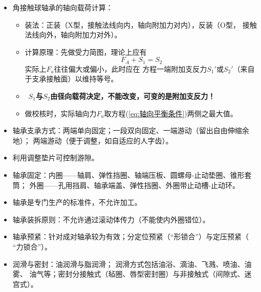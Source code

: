 \documentclass[12pt,a4paper]{article}
\newcommand{\tightlist}{\setlength{\parskip}{0pt}\setlength{\itemsep}{0pt}}
\newcommand{\hint}[1]{\textsf{（#1）}}
\newcommand{\minor}[1]{{\color{gray} #1}}
\renewcommand{\emph}[1]{\faIcon[regular]{lightbulb}\ \textbf{#1}}
\begin{document}
\begin{itemize}
{    算。}
    \item 角接触球轴承的轴向载荷计算：
    \begin{itemize}\tightlist
        \item 装法：正装\hint{X型，接触法线向内，轴向附加力对内}，反装\hint{O型，
        接触法线向外，轴向附加力对外}。
        \item 计算原理：先做受力简图，理论上应有
        \begin{equation}\label{eq:轴向平衡条件}
        F_A+S_1=S_2
        \end{equation}
        实际上$F_a$往往偏大或偏小，此时应在
        方程一端附加支反力$S_1'$或$S_2'$\hint{来自于支承接触面}以维持等号。
        \item \emph{$S_1$与$S_2$由径向载荷决定，不能改变，可变的是附加支反力！}
        \item 做校核时，实际轴向力$F_a$取方程(\ref{eq:轴向平衡条件})两侧之最大值。
    \end{itemize}
    \item 轴承支承方式：两端单向固定；一段双向固定、一端游动\hint{留出自由伸缩余地}；
    两端游动\hint{便于调整，如自适应的人字齿}。
    \item 利用调整垫片可控制游隙。
    \item \minor{轴承固定：内圈——轴肩、弹性挡圈、轴端压板、圆螺母-止动垫圈、锥形套筒；
    外圈——孔用挡肩、轴承端盖、弹性挡圈、外圈带止动槽-止动环。}
    \item \minor{轴承是专门生产的标准件，不允许加工。}
    \item 轴承装拆原则：不允许通过滚动体传力\hint{不能使内外圈错位}。
    \item 轴承预紧：针对成对轴承较为有效；分定位预紧\hint{“形锁合”}与定压预紧\hint{%
    “力锁合”}。
    \item 润滑与密封：油润滑与脂润滑；\minor{润滑方式包括油浴、滴油、飞溅、喷油、油雾、
    油气等；}密封分接触式\hint{毡圈、唇型密封圈}与非接触式\hint{间隙式、迷宫式}。
\end{itemize} 
\end{document}

